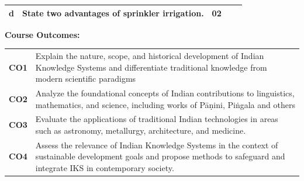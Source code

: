 \documentclass{rvcepaper}
\begin{document}
\begin{iempaperB}
\begin{longtable}{|C{1.05cm}|p{12.2cm}|C{0.95cm}|C{0.95cm}|C{0.95cm}|}
d & State two advantages of sprinkler irrigation. & 02 & & \\\hline
\end{longtable}
{\small\bfseries Course Outcomes:}\par
{\small
\begin{tabular}{@{}l@{\ }p{15.4cm}@{}}
\textbf{CO1} & Explain the nature, scope, and historical development of Indian Knowledge Systems and differentiate traditional knowledge from modern scientific paradigms\\
\textbf{CO2} & Analyze the foundational concepts of Indian contributions to linguistics, mathematics, and science, including works of Pāṇini, Piṅgala and others\\
\textbf{CO3} & Evaluate the applications of traditional Indian technologies in areas such as astronomy, metallurgy, architecture, and medicine.\\
\textbf{CO4} & Assess the relevance of Indian Knowledge Systems in the context of sustainable development goals and propose methods to safeguard and integrate IKS in contemporary society.\\
\end{tabular}}
\end{iempaperB}
\end{document}
